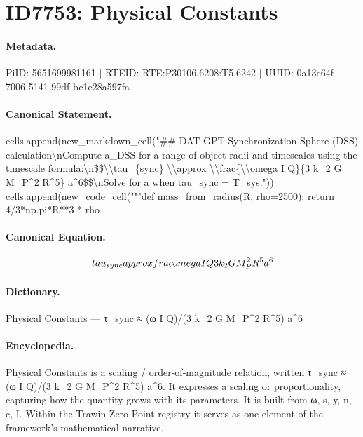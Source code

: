 \section*{ID7753: Physical Constants}
\paragraph{Metadata.}
PiID: 5651699981161 | RTEID: RTE:P30106.6208:T5.6242 | UUID: 0a13c64f-7006-5141-99df-bc1e28a597fa

\paragraph{Canonical Statement.}
cells.append(new\_markdown\_cell("\#\# DAT-GPT Synchronization Sphere (DSS) calculation\textbackslash{}nCompute a\_DSS for a range of object radii and timescales using the timescale formula:\textbackslash{}n\$\$\textbackslash{}\textbackslash{}tau\_\{sync\} \textbackslash{}\textbackslash{}approx \textbackslash{}\textbackslash{}frac\{\textbackslash{}\textbackslash{}omega I Q\}\{3 k\_2 G M\_P\textasciicircum{}2 R\textasciicircum{}5\} a\textasciicircum{}6\$\$\textbackslash{}nSolve for a when tau\_sync = T\_sys.")) cells.append(new\_code\_cell("""def mass\_from\_radius(R, rho=2500): return 4/3*np.pi*R**3 * rho

\paragraph{Canonical Equation.}
\[
\\tau_{sync} \\approx \\frac{\\omega I Q}{3 k_2 G M_P^2 R^5} a^6
\]

\paragraph{Dictionary.}
Physical Constants — τ\_sync ≈ (ω I Q)/(3 k\_2 G M\_P\textasciicircum{}2 R\textasciicircum{}5) a\textasciicircum{}6

\paragraph{Encyclopedia.}
Physical Constants is a scaling / order-of-magnitude relation, written τ\_sync ≈ (ω I Q)/(3 k\_2 G M\_P\textasciicircum{}2 R\textasciicircum{}5) a\textasciicircum{}6. It expresses a scaling or proportionality, capturing how the quantity grows with its parameters. It is built from ω, s, y, n, c, I. Within the Trawin Zero Point registry it serves as one element of the framework's mathematical narrative.
